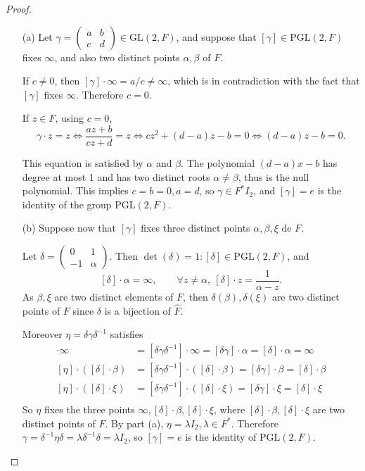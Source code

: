 \documentclass[11pt,a4paper]{article}
\begin{document}
\begin{proof}
\begin{enumerate}
\item[(a)]
Let  $\gamma =
\left(
\begin{array}{cc}
 a&   b   \\
 c&   d   
\end{array}
\right) 
\in \mathrm{GL}(2,F)
$, and suppose that $[\gamma] \in \mathrm{PGL}(2,F)$ fixes $\infty$, and also two distinct points $\alpha, \beta$ of $F$.

If  $c \neq 0$, then $[\gamma] \cdot \infty = a/c \neq \infty$, which is in contradiction with the fact that $[\gamma]$ fixes $\infty$. Therefore $c=0$.

If $z \in F$, using $c=0$,  $$\gamma \cdot z = z \iff  \frac{az+b}{cz+d} = z \iff cz^2 + (d-a)z-b=0 \iff (d-a) z -b=0.$$

This equation is satisfied by $\alpha$ and $\beta$. The polynomial $(d-a) x -b$  has degree at most 1 and has two distinct roots $\alpha \ne \beta$, thus is the null polynomial. This implies $c=b=0, a=d$, so $\gamma \in F^* I_2$, and $[\gamma] = e$ is the identity of the group $\mathrm{PGL}(2,F)$.

\item[(b)]
Suppose now that $[\gamma]$ fixes  three distinct points $\alpha,\beta,\xi$ de $F$.

Let $\delta = 
\left(
\begin{array}{cc}
 0&   1   \\
 -1&   \alpha  
\end{array}
\right) 
$. Then $\det(\delta) = 1 : [\delta] \in \mathrm{PGL}(2,F)$, and $$[\delta] \cdot \alpha = \infty,\qquad \forall z \neq \alpha, \ [\delta] \cdot z = \frac{1}{\alpha- z}.$$
As $\beta,\xi$ are two distinct elements of $F$, then $\delta(\beta), \delta(\xi)$ are two distinct points of $F$ since $\delta$ is a bijection of $\hat{F}$.

Moreover $\eta = \delta \gamma \delta^{-1}$ satisfies
\begin{align*}
[\eta] \cdot \infty  &= [\delta \gamma \delta^{-1}]\cdot \infty= [\delta \gamma] \cdot \alpha = [\delta] \cdot \alpha = \infty\\
[\eta] \cdot ([\delta] \cdot \beta) &= [\delta \gamma \delta^{-1}]\cdot ([\delta]\cdot  \beta)= [\delta \gamma] \cdot \beta = [\delta] \cdot \beta\\
[\eta] \cdot ([\delta]\cdot  \xi) &= [\delta \gamma \delta^{-1}]\cdot ([\delta]\cdot \xi)= [\delta \gamma] \cdot \xi = [\delta] \cdot \xi\\
\end{align*}
So $\eta$ fixes the three points $\infty, [\delta] \cdot \beta, [\delta] \cdot \xi$, where $[\delta] \cdot \beta, [\delta] \cdot \xi$ are two distinct points of $F$. By part (a), $\eta = \lambda I_2, \lambda \in F^*$. Therefore $\gamma = \delta^{-1} \eta \delta = \lambda \delta^{-1} \delta = \lambda I_2$, so $[\gamma] = e$ is the identity of $\mathrm{PGL}(2,F)$.


\end{enumerate}
\end{proof}
\end{document}

